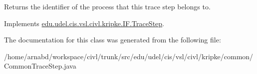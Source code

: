 \begin{DoxyReturn}{Returns}
the identifier of the process that this trace step belongs to. 
\end{DoxyReturn}


Implements \hyperlink{interfaceedu_1_1udel_1_1cis_1_1vsl_1_1civl_1_1kripke_1_1IF_1_1TraceStep_a7f46e65b0afcd1ab8900baa3ef364028}{edu.\+udel.\+cis.\+vsl.\+civl.\+kripke.\+I\+F.\+Trace\+Step}.



The documentation for this class was generated from the following file\+:\begin{DoxyCompactItemize}
\item 
/home/arnabd/workspace/civl/trunk/src/edu/udel/cis/vsl/civl/kripke/common/Common\+Trace\+Step.\+java\end{DoxyCompactItemize}
